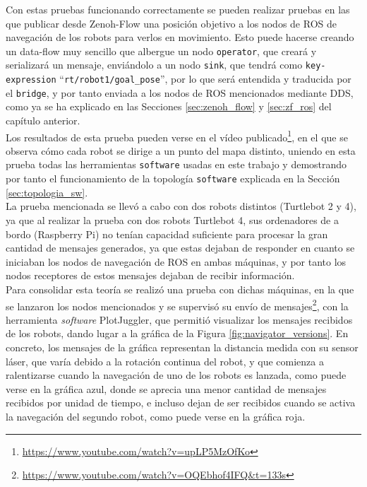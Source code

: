 Con estas pruebas funcionando correctamente se pueden realizar pruebas en las
que publicar desde Zenoh-Flow una posición objetivo a los nodos de ROS de
navegación de los robots para verlos en movimiento.
Esto puede hacerse creando un data-flow muy sencillo que albergue un nodo
\texttt{operator}, que creará y serializará un mensaje, enviándolo a un nodo
\texttt{sink}, que tendrá como \texttt{key-expression}
``\texttt{rt/robot1/goal\_pose}'', por lo que será entendida y traducida por el
\texttt{bridge}, y por tanto enviada a los nodos de ROS mencionados mediante
DDS, como ya se ha explicado en las Secciones \ref{sec:zenoh_flow} y
\ref{sec:zf_ros} del capítulo anterior.
\\

Los resultados de esta prueba pueden verse en el vídeo publicado\footnote{
\url{https://www.youtube.com/watch?v=upLP5MzOfKo}}, en el que se observa cómo
cada robot se dirige a un punto del mapa distinto, uniendo en esta prueba todas
las herramientas \texttt{software} usadas en este trabajo y demostrando por
tanto el funcionamiento de la topología \texttt{software} explicada en la
Sección \ref{sec:topologia_sw}.
\\

La prueba mencionada se llevó a cabo con dos robots distintos (Turtlebot 2 y 4),
ya que al realizar la prueba con dos robots Turtlebot 4, sus ordenadores de a
bordo (Raspberry Pi) no tenían capacidad suficiente para procesar la gran
cantidad de mensajes generados, ya que estas dejaban de responder en cuanto se
iniciaban los nodos de navegación de ROS en ambas máquinas, y por tanto los
nodos receptores de estos mensajes dejaban de recibir información.
\\

Para consolidar esta teoría se realizó una prueba con dichas máquinas, en la que
se lanzaron los nodos mencionados y se supervisó su envío de
mensajes\footnote{\url{https://www.youtube.com/watch?v=OQEbhof4IFQ&t=133s}}, con
la herramienta \textit{software} PlotJuggler, que permitió visualizar los
mensajes recibidos de los robots, dando lugar a la gráfica de la Figura
\ref{fig:navigator_versions}.
En concreto, los mensajes de la gráfica representan la distancia medida con su
sensor láser, que varía debido a la rotación continua del robot, y que comienza
a ralentizarse cuando la navegación de uno de los robots es lanzada, como puede
verse en la gráfica azul, donde se aprecia una menor cantidad de mensajes
recibidos por unidad de tiempo, e incluso dejan de ser recibidos cuando se
activa la navegación del segundo robot, como puede verse en la gráfica roja.
\\

